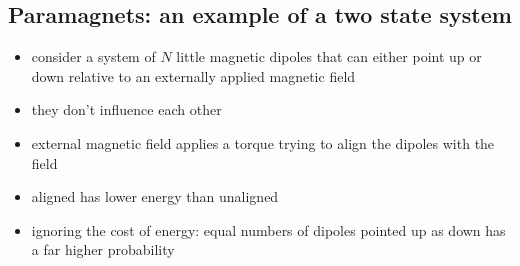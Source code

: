 \documentclass[10pt]{article}
\begin{document}
\subsection{Paramagnets: an example of a two state system}
\begin{itemize}
    \item consider a system of $N$ little magnetic dipoles that can either point up or down relative to an externally applied magnetic field
    \item they don't influence each other
    \item external magnetic field applies a torque trying to align the dipoles with the field
    \item aligned has lower energy than unaligned
    \item ignoring the cost of energy: equal numbers of dipoles pointed up as down has a far higher probability
\end{itemize}
\end{document}
